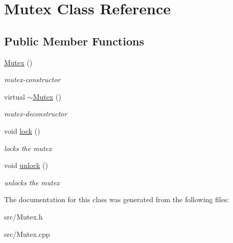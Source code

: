 \hypertarget{classMutex}{\section{Mutex Class Reference}
\label{classMutex}
}
\subsection*{Public Member Functions}
\begin{DoxyCompactItemize}
\item 
\hypertarget{classMutex_a593423d868daf926c7b0d63a833ae29a}{\hyperlink{classMutex_a593423d868daf926c7b0d63a833ae29a}{Mutex} ()}\label{classMutex_a593423d868daf926c7b0d63a833ae29a}

\begin{DoxyCompactList}\small\item\em mutex-\/constructor \end{DoxyCompactList}\item 
\hypertarget{classMutex_ac9e9182407f5f74892318607888e9be4}{virtual \hyperlink{classMutex_ac9e9182407f5f74892318607888e9be4}{$\sim$\-Mutex} ()}\label{classMutex_ac9e9182407f5f74892318607888e9be4}

\begin{DoxyCompactList}\small\item\em mutex-\/deconstructor \end{DoxyCompactList}\item 
\hypertarget{classMutex_ad91be808bf0a60a16f10b897ec246d3a}{void \hyperlink{classMutex_ad91be808bf0a60a16f10b897ec246d3a}{lock} ()}\label{classMutex_ad91be808bf0a60a16f10b897ec246d3a}

\begin{DoxyCompactList}\small\item\em locks the mutex \end{DoxyCompactList}\item 
\hypertarget{classMutex_a546a5b797ba29959357586aa2b3740a8}{void \hyperlink{classMutex_a546a5b797ba29959357586aa2b3740a8}{unlock} ()}\label{classMutex_a546a5b797ba29959357586aa2b3740a8}

\begin{DoxyCompactList}\small\item\em unlocks the mutex \end{DoxyCompactList}\end{DoxyCompactItemize}


The documentation for this class was generated from the following files\-:\begin{DoxyCompactItemize}
\item 
src/Mutex.\-h\item 
src/Mutex.\-cpp\end{DoxyCompactItemize}
